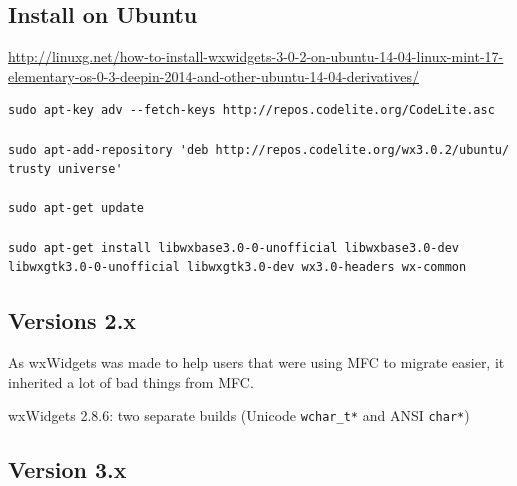 %   
%   
%   

\subsection{Install on Ubuntu}
\label{sec:wxWidgets-install}

\url{http://linuxg.net/how-to-install-wxwidgets-3-0-2-on-ubuntu-14-04-linux-mint-17-elementary-os-0-3-deepin-2014-and-other-ubuntu-14-04-derivatives/}
{\tiny
\begin{verbatim}
sudo apt-key adv --fetch-keys http://repos.codelite.org/CodeLite.asc

sudo apt-add-repository 'deb http://repos.codelite.org/wx3.0.2/ubuntu/ trusty universe'

sudo apt-get update

sudo apt-get install libwxbase3.0-0-unofficial libwxbase3.0-dev libwxgtk3.0-0-unofficial libwxgtk3.0-dev wx3.0-headers wx-common
\end{verbatim}
}


\subsection{Versions 2.x}

As wxWidgets was made to help users that were using MFC to migrate easier, it
inherited a lot of bad things from MFC.

wxWidgets 2.8.6: two separate builds (Unicode \verb!wchar_t*! and ANSI \verb!char*!)

\subsection{Version 3.x}

